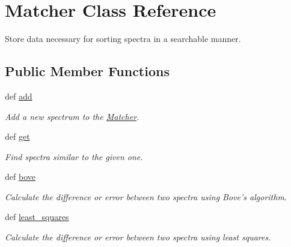 \hypertarget{classbackend_1_1_matcher}{
\section{Matcher Class Reference}
\label{classbackend_1_1_matcher}
}


Store data necessary for sorting spectra in a searchable manner.  


\subsection*{Public Member Functions}
\begin{DoxyCompactItemize}
\item 
def \hyperlink{classbackend_1_1_matcher_a66aa7c8063db6217a0a0061f8b7ba206}{add}
\begin{DoxyCompactList}\small\item\em Add a new spectrum to the \hyperlink{classbackend_1_1_matcher}{Matcher}. \item\end{DoxyCompactList}\item 
def \hyperlink{classbackend_1_1_matcher_a444a1328efb32d5d9d2dcb2efe855d3b}{get}
\begin{DoxyCompactList}\small\item\em Find spectra similar to the given one. \item\end{DoxyCompactList}\item 
def \hyperlink{classbackend_1_1_matcher_a989553190033eaa893e27d2907fce91e}{bove}
\begin{DoxyCompactList}\small\item\em Calculate the difference or error between two spectra using Bove's algorithm. \item\end{DoxyCompactList}\item 
def \hyperlink{classbackend_1_1_matcher_ab324f6c7c11f54b7617ecdee14f76049}{least\_\-squares}
\begin{DoxyCompactList}\small\item\em Calculate the difference or error between two spectra using least squares. \item\end{DoxyCompactList}\end{DoxyCompactItemize}
